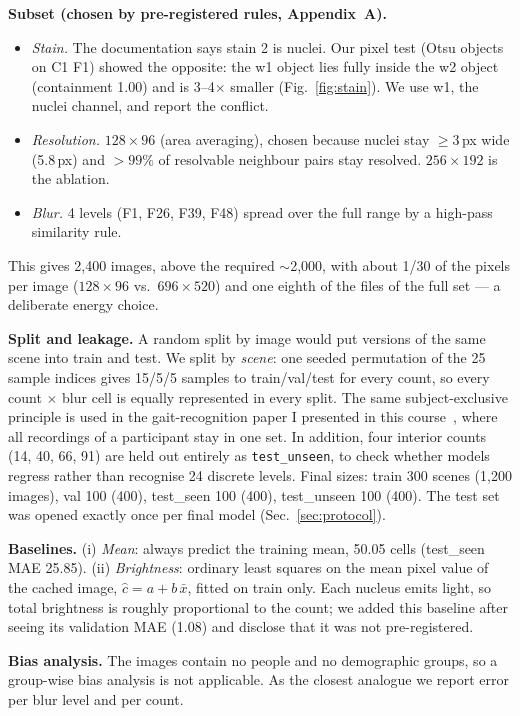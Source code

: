 \documentclass[11pt,a4paper]{article}
\begin{document}
\textbf{Subset (chosen by pre-registered rules, Appendix~A).}
\begin{itemize}\setlength\itemsep{0pt}
\item \emph{Stain.} The documentation says stain 2 is nuclei. Our pixel test (Otsu objects on C1 F1)
showed the opposite: the w1 object lies fully inside the w2 object (containment 1.00) and is
3--4$\times$ smaller (Fig.~\ref{fig:stain}). We use w1, the nuclei channel, and report the conflict.
\item \emph{Resolution.} $128\times96$ (area averaging), chosen because nuclei stay $\geq3$\,px wide
(5.8\,px) and $>99\%$ of resolvable neighbour pairs stay resolved. $256\times192$ is the ablation.
\item \emph{Blur.} 4 levels (F1, F26, F39, F48) spread over the full range by a high-pass similarity rule.
\end{itemize}
This gives 2{,}400 images, above the required $\sim$2{,}000, with about 1/30 of the pixels per image
($128\times96$ vs.\ $696\times520$) and one eighth of the files of the full set --- a deliberate energy choice.

\textbf{Split and leakage.} A random split by image would put versions of the same scene into train
and test. We split by \emph{scene}: one seeded permutation of the 25 sample indices gives 15/5/5
samples to train/val/test for every count, so every count $\times$ blur cell is equally represented
in every split. The same subject-exclusive principle is used in the gait-recognition paper I presented
in this course~\cite{zhao2024}, where all recordings of a participant stay in one set.
In addition, four interior counts (14, 40, 66, 91) are held out entirely as \texttt{test\_unseen},
to check whether models regress rather than recognise 24 discrete levels. Final sizes:
train 300 scenes (1{,}200 images), val 100 (400), test\_seen 100 (400), test\_unseen 100 (400).
The test set was opened exactly once per final model (Sec.~\ref{sec:protocol}).

\textbf{Baselines.} (i) \emph{Mean}: always predict the training mean, 50.05 cells (test\_seen MAE
25.85). (ii) \emph{Brightness}: ordinary least squares on the mean pixel value of the cached image,
$\hat{c}=a+b\,\bar{x}$, fitted on train only. Each nucleus emits light, so total brightness is roughly
proportional to the count; we added this baseline after seeing its validation MAE (1.08) and
disclose that it was not pre-registered.

\textbf{Bias analysis.} The images contain no people and no demographic groups, so a group-wise bias
analysis is not applicable. As the closest analogue we report error per blur level and per count.
\end{document}
